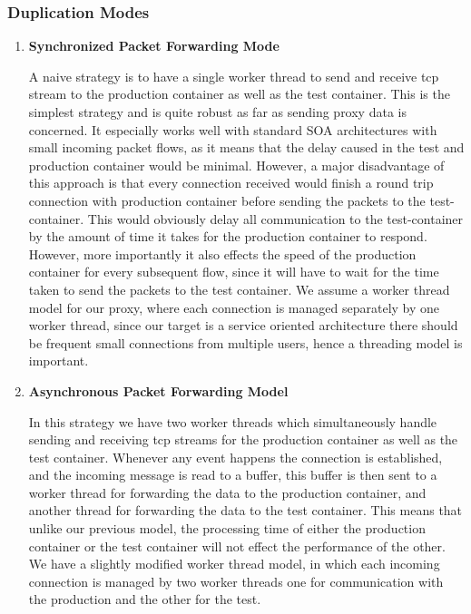 

\subsubsection{Duplication Modes}
\label{sec:dupMode}

\begin{enumerate}

\item \textbf{Synchronized Packet Forwarding Mode}

A naive strategy is to have a single worker thread to send and receive tcp stream to the production container as well as the test container.
This is the simplest strategy and is quite robust as far as sending proxy data is concerned. 
It especially works well with standard SOA architectures with small incoming packet flows, as it means that the delay caused in the test and production container would be minimal.
However, a major disadvantage of this approach is that every connection received would finish a round trip connection with production container before sending the packets to the test-container.
This would obviously delay all communication to the test-container by the amount of time it takes for the production container to respond. 
However, more importantly it also effects the speed of the production container for every subsequent flow, since it will have to wait for the time taken to send the packets to the test container.
We assume a worker thread model for our proxy, where each connection is managed separately by one worker thread, since our target is a service oriented architecture there should be frequent small connections from multiple users, hence a threading model is important.

  \item \textbf{Asynchronous Packet Forwarding Model}

In this strategy we have two worker threads which simultaneously handle sending and receiving tcp streams for the production container as well as the test container.
Whenever any event happens the connection is established, and the incoming message is read to a buffer, this buffer is then sent to a worker thread for forwarding the data to the production container, and another thread for forwarding the data to the test container. 
This means that unlike our previous model, the processing time of either the production container or the test container will not effect the performance of the other.
We have a slightly modified worker thread model, in which each incoming connection is managed by two worker threads one for communication with the production and the other for the test.


\end{enumerate}
